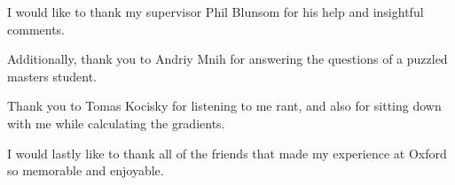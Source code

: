 \begin{acknowledgements}

I would like to thank my supervisor Phil Blunsom for his help and insightful comments.

Additionally, thank you to Andriy Mnih for answering the questions of a puzzled masters student.

Thank you to Tomas Kocisky for listening to me rant, and also for sitting down with me while calculating the gradients. 

I would lastly like to thank all of the friends that made my experience at Oxford so memorable and enjoyable.

\end{acknowledgements}